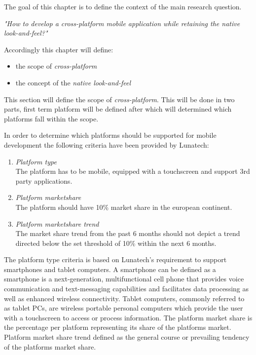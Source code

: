 The goal of this chapter is to define the context of the main research question.

\indent \emph{"How to develop a cross-platform mobile application while retaining the native look-and-feel?"}

\noindent Accordingly this chapter will define:
\begin{itemize}
\item the scope of \emph{cross-platform}
\item the concept of the \emph{native look-and-feel}
\end{itemize}

This section will define the scope of \emph{cross-platform}. This will be done in two parts, first term platform will be defined after which will determined which platforms fall within the scope.

In order to determine which platforms should be supported for mobile development the following criteria have been provided by Lunatech:

\begin{enumerate}	
\item \emph{Platform type}\\
The platform has to be mobile, equipped with a touchscreen and support 3rd party applications. %
\item \emph{Platform marketshare}\\
The platform should have 10\% market share in the european continent.
\item \emph{Platform marketshare trend}\\
The market share trend from the past 6 months should not depict a trend directed below the set threshold of 10\% within the next 6 months.
\end{enumerate}

The platform type criteria is based on Lunatech's requirement to support smartphones and tablet computers. A smartphone can be defined as a smartphone is a next-generation, multifunctional cell phone that provides voice communication and text-messaging capabilities and facilitates data processing as well as enhanced wireless connectivity.\cite{Ni2006} Tablet computers, commonly referred to as tablet PCs, are wireless portable personal computers which provide the user with a touchscreen to access or process information.\cite{Leigh2011} The platform market share is the percentage per platform representing its share of the platforms market. Platform market share trend defined as the general course or prevailing tendency of the platforms market share.

